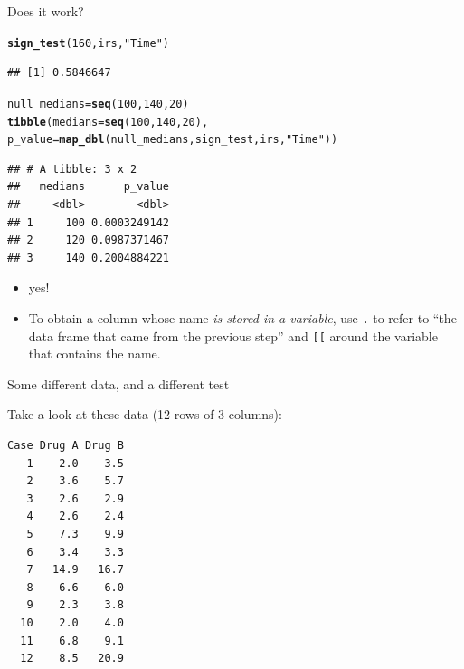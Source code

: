 \documentclass[unknownkeysallowed]{beamer}\usepackage[]{graphicx}\usepackage[]{color}
\makeatletter
\newcommand{\hlnum}[1]{\textcolor[rgb]{0.686,0.059,0.569}{#1}}%
\newcommand{\hlstr}[1]{\textcolor[rgb]{0.192,0.494,0.8}{#1}}%
\newcommand{\hlstd}[1]{\textcolor[rgb]{0.345,0.345,0.345}{#1}}%
\newcommand{\hlkwb}[1]{\textcolor[rgb]{0.69,0.353,0.396}{#1}}%
\newcommand{\hlkwc}[1]{\textcolor[rgb]{0.333,0.667,0.333}{#1}}%
\newcommand{\hlkwd}[1]{\textcolor[rgb]{0.737,0.353,0.396}{\textbf{#1}}}%
\newenvironment{kframe}{%
 \def\at@end@of@kframe{}%
 \ifinner\ifhmode%
  \def\at@end@of@kframe{\end{minipage}}%
  \begin{minipage}{\columnwidth}%
 \fi\fi%
 \def\FrameCommand##1{\hskip\@totalleftmargin \hskip-\fboxsep
 \colorbox{shadecolor}{##1}\hskip-\fboxsep
     \hskip-\linewidth \hskip-\@totalleftmargin \hskip\columnwidth}%
 \MakeFramed {\advance\hsize-\width
   \@totalleftmargin\z@ \linewidth\hsize
   \@setminipage}}%
 {\par\unskip\endMakeFramed%
 \at@end@of@kframe}
\newenvironment{knitrout}{}{} %
\makeatother
\begin{document}
\begin{frame}[fragile]{Does it work?}
  
\begin{knitrout}
\color{fgcolor}\begin{kframe}
\begin{alltt}
\hlkwd{sign_test}\hlstd{(}\hlnum{160}\hlstd{,irs,}\hlstr{"Time"}\hlstd{)}
\end{alltt}
\begin{verbatim}
## [1] 0.5846647
\end{verbatim}
\begin{alltt}
\hlstd{null_medians}\hlkwb{=}\hlkwd{seq}\hlstd{(}\hlnum{100}\hlstd{,}\hlnum{140}\hlstd{,}\hlnum{20}\hlstd{)}
\hlkwd{tibble}\hlstd{(}\hlkwc{medians}\hlstd{=}\hlkwd{seq}\hlstd{(}\hlnum{100}\hlstd{,}\hlnum{140}\hlstd{,}\hlnum{20}\hlstd{),}
  \hlkwc{p_value}\hlstd{=}\hlkwd{map_dbl}\hlstd{(null_medians,sign_test,irs,}\hlstr{"Time"}\hlstd{))}
\end{alltt}
\begin{verbatim}
## # A tibble: 3 x 2
##   medians      p_value
##     <dbl>        <dbl>
## 1     100 0.0003249142
## 2     120 0.0987371467
## 3     140 0.2004884221
\end{verbatim}
\end{kframe}
\end{knitrout}

\begin{itemize}
\item yes!
\item To obtain a column whose name \emph{is stored in a
    variable}, use \texttt{.} to refer to ``the data frame that came
  from the previous step'' and \texttt{[[} around the variable that
      contains the name.
\end{itemize}
  
\end{frame}
 
\begin{frame}[fragile]{Some different data, and a different test}

Take a look at these data (12 rows of 3 columns):

\bigskip

\begin{multicols}{2}
\begin{verbatim}
Case Drug A Drug B
   1    2.0    3.5
   2    3.6    5.7
   3    2.6    2.9
   4    2.6    2.4
   5    7.3    9.9
   6    3.4    3.3
   7   14.9   16.7
   8    6.6    6.0
   9    2.3    3.8
  10    2.0    4.0
  11    6.8    9.1
  12    8.5   20.9
\end{verbatim}
  
\end{multicols}


\end{frame}
\end{document}
